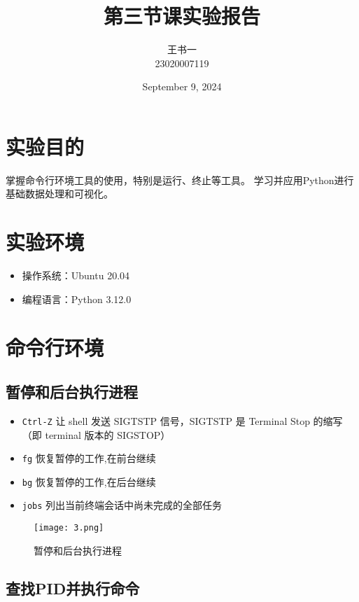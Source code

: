 \documentclass[a4paper, 12pt]{article}
\begin{document}
  \title{第三节课实验报告}
  \author{王书一 \\ 23020007119}
  \date{September 9, 2024}
  \maketitle

 \tableofcontents
 \newpage

  
  \section{实验目的}
  掌握命令行环境工具的使用，特别是运行、终止等工具。
学习并应用Python进行基础数据处理和可视化。
  
\section{实验环境}
\begin{itemize}
    \item 操作系统：Ubuntu 20.04
   \item 编程语言：Python 3.12.0
\end{itemize}

\section{命令行环境}

\subsection{暂停和后台执行进程}


\begin{itemize}
    \item \texttt{Ctrl-Z}       让 shell 发送 SIGTSTP 信号，SIGTSTP 是 Terminal Stop 的缩写（即 terminal 版本的 SIGSTOP）
    \item \texttt{fg}        恢复暂停的工作,在前台继续
    \item \texttt{bg}        恢复暂停的工作,在后台继续
    \item \texttt{jobs}     列出当前终端会话中尚未完成的全部任务
\end{itemize}

\begin{figure}[H]
  \centering
    \texttt{[image: 3.png]}
  \caption{暂停和后台执行进程}
   \end{figure}

\subsection{查找PID并执行命令}  
\end{document}

